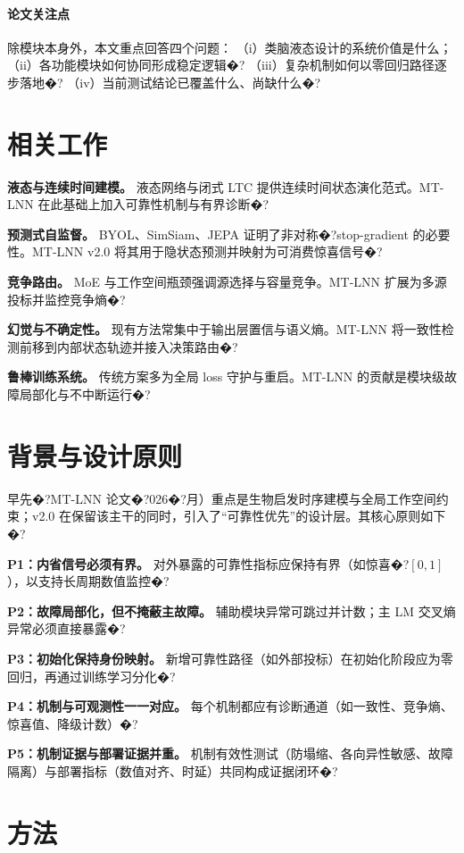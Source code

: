\documentclass[10pt,twocolumn]{ctexart}
\begin{document}
\paragraph{论文关注点}
除模块本身外，本文重点回答四个问题：
（i）类脑液态设计的系统价值是什么；
（ii）各功能模块如何协同形成稳定逻辑�?
（iii）复杂机制如何以零回归路径逐步落地�?
（iv）当前测试结论已覆盖什么、尚缺什么�?

\section{相关工作}
\textbf{液态与连续时间建模。} 液态网络与闭式 LTC 提供连续时间状态演化范式。MT-LNN 在此基础上加入可靠性机制与有界诊断�?

\textbf{预测式自监督。} BYOL、SimSiam、JEPA 证明了非对称�?stop-gradient 的必要性。MT-LNN v2.0 将其用于隐状态预测并映射为可消费惊喜信号�?

\textbf{竞争路由。} MoE 与工作空间瓶颈强调源选择与容量竞争。MT-LNN 扩展为多源投标并监控竞争熵�?

\textbf{幻觉与不确定性。} 现有方法常集中于输出层置信与语义熵。MT-LNN 将一致性检测前移到内部状态轨迹并接入决策路由�?

\textbf{鲁棒训练系统。} 传统方案多为全局 loss 守护与重启。MT-LNN 的贡献是模块级故障局部化与不中断运行�?

\section{背景与设计原则}
早先�?MT-LNN 论文�?026�?月）重点是生物启发时序建模与全局工作空间约束；v2.0 在保留该主干的同时，引入了“可靠性优先”的设计层。其核心原则如下�?

\textbf{P1：内省信号必须有界。} 对外暴露的可靠性指标应保持有界（如惊喜�?$[0,1]$），以支持长周期数值监控�?

\textbf{P2：故障局部化，但不掩蔽主故障。} 辅助模块异常可跳过并计数；主 LM 交叉熵异常必须直接暴露�?

\textbf{P3：初始化保持身份映射。} 新增可靠性路径（如外部投标）在初始化阶段应为零回归，再通过训练学习分化�?

\textbf{P4：机制与可观测性一一对应。} 每个机制都应有诊断通道（如一致性、竞争熵、惊喜值、降级计数）�?

\textbf{P5：机制证据与部署证据并重。} 机制有效性测试（防塌缩、各向异性敏感、故障隔离）与部署指标（数值对齐、时延）共同构成证据闭环�?

\section{方法}
\end{document}
